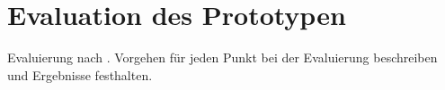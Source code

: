 \section{Evaluation des Prototypen}
\label{sec:evaluation}

Evaluierung nach \cite{Miessler}.
Vorgehen für jeden Punkt bei der Evaluierung beschreiben und Ergebnisse festhalten.
